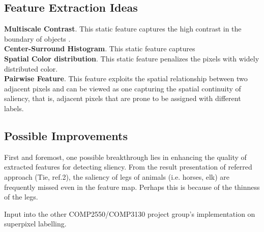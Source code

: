 \documentclass[12pt,a4paper]{article}
\newcommand{\htab}{\hspace*{0.63cm}}
\begin{document}
\begin{multicols}{2}
\subsection{Feature Extraction Ideas}
\textbf{Multiscale Contrast}. This static feature captures the high contrast in the boundary of objects . \\[0.1cm]
\textbf{Center-Surround Histogram}. This static feature captures  \\[0.1cm]
\textbf{Spatial Color distribution}. This static feature penalizes the pixels with widely distributed color. \\[0.1cm]
\textbf{Pairwise Feature}. This feature exploits the spatial relationship between two adjacent pixels and can be viewed as one capturing the spatial continuity of saliency, that is, adjacent pixels that are prone to be assigned with different labels. 
\subsection{Possible Improvements}
\htab First and foremost, one possible breakthrough lies in enhancing the quality of extracted features for detecting sliency. From the result presentation of referred approach (Tie, ref.2), the saliency of legs of animals (i.e. horses, elk) are frequently missed even in the feature map. Perhaps this is because of the thinness of the legs.

Input into the other COMP2550/COMP3130 project group's implementation on superpixel labelling.

\end{multicols}
\end{document}
